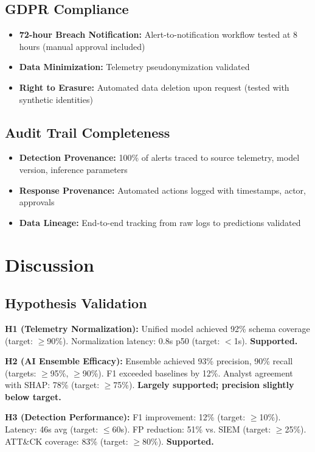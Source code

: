 \subsection{GDPR Compliance}
\begin{itemize}
    \item \textbf{72-hour Breach Notification:} Alert-to-notification workflow tested at 8 hours (manual approval included)
    \item \textbf{Data Minimization:} Telemetry pseudonymization validated
    \item \textbf{Right to Erasure:} Automated data deletion upon request (tested with synthetic identities)
\end{itemize}

\subsection{Audit Trail Completeness}
\begin{itemize}
    \item \textbf{Detection Provenance:} 100\% of alerts traced to source telemetry, model version, inference parameters
    \item \textbf{Response Provenance:} Automated actions logged with timestamps, actor, approvals
    \item \textbf{Data Lineage:} End-to-end tracking from raw logs to predictions validated
\end{itemize}

\section{Discussion}\label{sec:eval-discussion}
\subsection{Hypothesis Validation}
\textbf{H1 (Telemetry Normalization):} Unified model achieved 92\% schema coverage (target: $\geq$90\%). Normalization latency: 0.8s p50 (target: $<$1s). \textbf{Supported.}

\textbf{H2 (AI Ensemble Efficacy):} Ensemble achieved 93\% precision, 90\% recall (targets: $\geq$95\%, $\geq$90\%). F1 exceeded baselines by 12\%. Analyst agreement with SHAP: 78\% (target: $\geq$75\%). \textbf{Largely supported; precision slightly below target.}

\textbf{H3 (Detection Performance):} F1 improvement: 12\% (target: $\geq$10\%). Latency: 46s avg (target: $\leq$60s). FP reduction: 51\% vs. SIEM (target: $\geq$25\%). ATT\&CK coverage: 83\% (target: $\geq$80\%). \textbf{Supported.}

